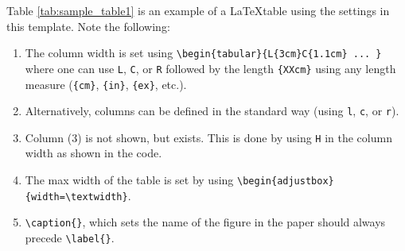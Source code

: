 
Table \ref{tab:sample_table1} is an example of a \LaTeX table using the settings in this template. Note the following:

\begin{enumerate}
\item The column width is set using \Verb"\begin{tabular}{L{3cm}C{1.1cm} ... }" where one can use \texttt{L}, \texttt{C}, or \texttt{R} followed by the length \Verb"{XXcm}" using any length measure (\Verb"{cm}", \Verb"{in}", \Verb"{ex}",  etc.). 
\item Alternatively, columns can be defined in the standard way (using \texttt{l}, \texttt{c}, or \texttt{r}).
\item Column (3) is not shown, but exists. This is done by using \texttt{H} in the column width as shown in the code.
\item The max width of the table is set by using \Verb"\begin{adjustbox}{width=\textwidth}".
\item \Verb"\caption{}", which sets the name of the figure in the paper should always precede \Verb"\label{}".
\end{enumerate}


